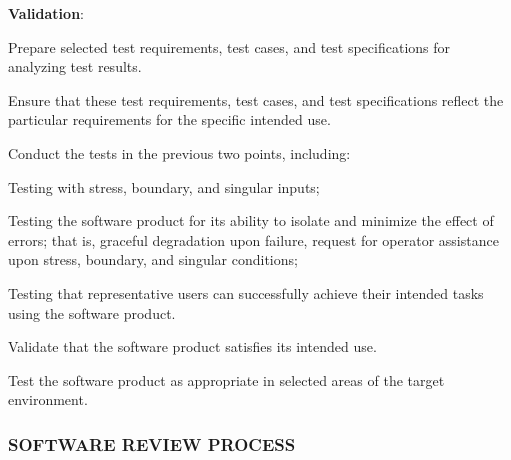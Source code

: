 \begin{adjustwidth}{2em}{0pt}
\begin{compactenum}
\begin{compactenum}
					\end{compactenum}

					\item {\bf Validation}:

					\begin{compactenum}

						\item Prepare selected test requirements, test cases, and test specifications for analyzing test results.

						\item Ensure that these test requirements, test cases, and test specifications reflect the particular requirements for the specific intended use.

						\item Conduct the tests in the previous two points, including:

						\begin{compactenum}

							\item Testing with stress, boundary, and singular inputs;

							\item Testing the software product for its ability to isolate and minimize the effect of errors; that is, graceful degradation upon failure, request for operator assistance upon stress, boundary, and singular conditions;

							\item Testing that representative users can successfully achieve their intended tasks using the software product.

						\end{compactenum}
						
						\item Validate that the software product satisfies its intended use.

						\item Test the software product as appropriate in selected areas of the target environment.

					\end{compactenum}

				\end{compactenum}

			\end{adjustwidth}

		\newpage
		\subsubsection{SOFTWARE REVIEW PROCESS\label{proc:software_review_process}}

